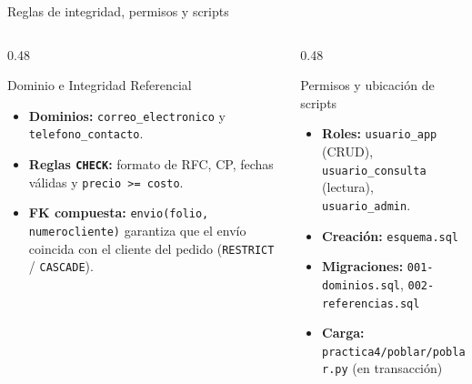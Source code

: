 \documentclass[aspectratio=169,11pt]{beamer}
\begin{document}
\begin{frame}{Reglas de integridad, permisos y scripts}
  \begin{columns}[T,totalwidth=\textwidth]
    \begin{column}{0.48\textwidth}
      \begin{block}{Dominio e Integridad Referencial}
        \begin{itemize}
          \item \textbf{Dominios:} \texttt{correo\_electronico} y \texttt{telefono\_contacto}.
          \item \textbf{Reglas \texttt{CHECK}:} formato de RFC, CP, fechas válidas y \texttt{precio >= costo}.
          \item \textbf{FK compuesta:} \texttt{envio(folio, numerocliente)} garantiza que el envío coincida con el cliente del pedido (\texttt{RESTRICT} / \texttt{CASCADE}).
        \end{itemize}
      \end{block}
    \end{column}

    \begin{column}{0.48\textwidth}
      \begin{exampleblock}{Permisos y ubicación de scripts}
        \begin{itemize}
          \item \textbf{Roles:} \texttt{usuario\_app} (CRUD), \texttt{usuario\_consulta} (lectura), \texttt{usuario\_admin}.
          \item \textbf{Creación:} \texttt{esquema.sql}
          \item \textbf{Migraciones:} \texttt{001-dominios.sql}, \texttt{002-referencias.sql}
          \item \textbf{Carga:} \texttt{practica4/poblar/poblar.py} (en transacción)
        \end{itemize}
      \end{exampleblock}
    \end{column}
  \end{columns}
\end{frame}
\end{document}
